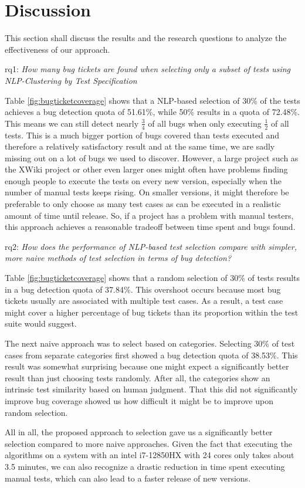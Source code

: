 \section{Discussion}

This section shall discuss the results and the research questions to analyze the effectiveness of our approach.

\ac{rq}1: \emph{How many bug tickets are found when selecting only a subset of tests using NLP-Clustering by Test Specification}

Table \ref{fig:bugticketcoverage} shows that a \ac{NLP}-based selection of 30\% of the tests achieves a bug detection quota of 51.61\%, while 50\% results in a quota of 72.48\%.
This means we can still detect nearly $\frac{3}{4}$ of all bugs when only executing $\frac{1}{2}$ of all tests.
This is a much bigger portion of bugs covered than tests executed and therefore a relatively satisfactory result and at the same time, we are sadly missing out on a lot of bugs we used to discover.
However, a large project such as the XWiki project or other even larger ones might often have problems finding enough people to execute the tests on every new version, especially when the number of manual tests keeps rising. On smaller versions, it might therefore be preferable to only choose as many test cases as can be executed in a realistic amount of time until release.
So, if a project has a problem with manual testers, this approach achieves a reasonable tradeoff between time spent and bugs found.

\ac{rq}2: \emph{How does the performance of NLP-based test selection compare with simpler, more naive methods of test selection in terms of bug detection?}

Table \ref{fig:bugticketcoverage} shows that a random selection of 30\% of tests results in a bug detection quota of 37.84\%. This overshoot occurs because most bug tickets usually are associated with multiple test cases. As a result, a test case might cover a higher percentage of bug tickets than its proportion within the test suite would suggest.

The next naive approach was to select based on categories. Selecting 30\% of test cases from separate categories first showed a bug detection quota of 38.53\%. This result was somewhat surprising because one might expect a significantly better result than just choosing tests randomly. After all, the categories show an intrinsic test similarity based on human judgment. That this did not significantly improve bug coverage showed us how difficult it might be to improve upon random selection.

All in all, the proposed approach to selection gave us a significantly better selection compared to more naive approaches. Given the fact that executing the algorithms on a system with an intel i7-12850HX with 24 cores only takes about 3.5 minutes, we can also recognize a drastic reduction in time spent executing manual tests, which can also lead to a faster release of new versions.

